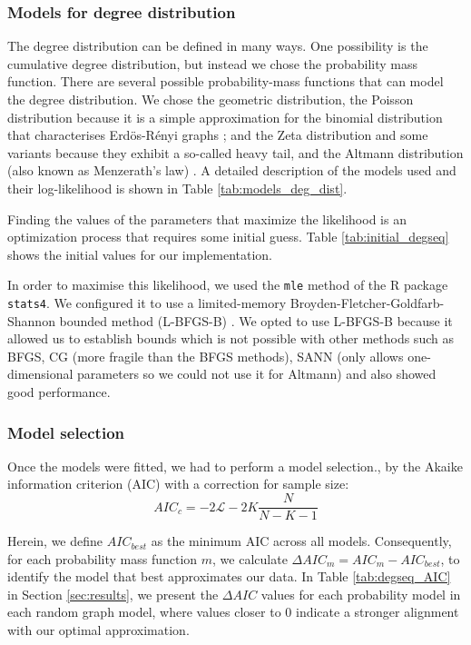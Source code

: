 \subsubsection{Models for degree distribution}\label{sec:mod_degseq}
The degree distribution can be defined in many ways. One possibility is the cumulative degree distribution, but instead we chose the probability mass function. There are several possible probability-mass functions that can model the degree distribution. We chose the geometric distribution, the Poisson distribution because it is a simple approximation for the binomial distribution that characterises Erdös-Rényi graphs \cite{Newman2010}; and the Zeta distribution and some variants because they exhibit a so-called heavy tail, and the Altmann distribution (also known as Menzerath's law) \cite{Altmann1980}. A detailed description of the models used and their log-likelihood is shown in Table \ref{tab:models_deg_dist}.


Finding the values of the parameters that maximize the likelihood is an optimization process that requires some initial guess. Table \ref{tab:initial_degseq} shows the initial values for our implementation.



In order to maximise this likelihood, we used the \verb|mle| method of the R package \verb|stats4|. We configured it to use a limited-memory Broyden-Fletcher-Goldfarb-Shannon bounded method (L-BFGS-B) \cite{Byrd1995}. We opted to use L-BFGS-B because it allowed us to establish bounds which is not possible with other methods such as BFGS, CG (more fragile than the BFGS methods), SANN (only allows one-dimensional parameters so we could not use it for Altmann) and also showed good performance.

\subsubsection{Model selection}
Once the models were fitted, we had to perform a model selection., by the Akaike information criterion (AIC)\cite{Akaike1998} with a correction for sample size:
\begin{equation}
    AIC_c = -2\mathcal{L} - 2K\frac{N}{N-K-1}
\end{equation}

Herein, we define $AIC_{best}$ as the minimum AIC across all models. Consequently, for each probability mass function $m$, we calculate $\Delta AIC_m = AIC_m - AIC_{best}$, to identify the model that best approximates our data. In Table \ref{tab:degseq_AIC} in Section \ref{sec:results}, we present the $\Delta AIC$ values for each probability model in each random graph model, where values closer to 0 indicate a stronger alignment with our optimal approximation.


